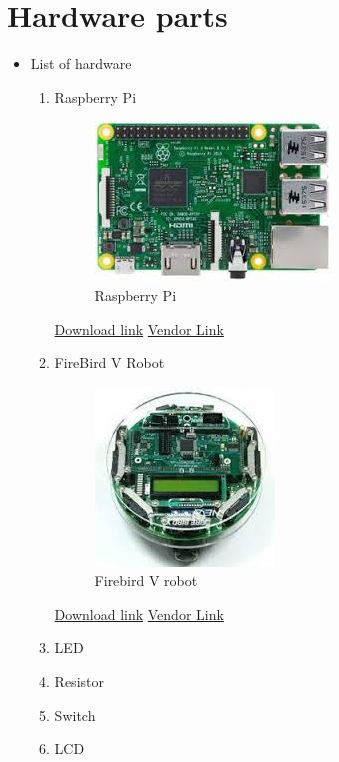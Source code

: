 \documentclass[a4paper,12pt,oneside]{book}
\begin{document}
\section{Hardware parts}
\begin{itemize}
  \item List of hardware 
  \begin{enumerate}
      \item Raspberry Pi \\
      \begin{figure}[H]
        \centering
        \includegraphics[scale=0.6]{RPi}
        \caption{Raspberry Pi}
      \end{figure}
      \href{https://cdn-shop.adafruit.com/pdfs/raspberrypi2modelb.pdf} {Download link}
      \href{http://www.amazon.in/Raspberry-Pi-Model-1GB-Complete/dp/B00T2U7R7I} {Vendor Link}
      \item FireBird V Robot \\
      \begin{figure}[H]
        \centering
        \includegraphics[scale=0.6]{Firebird_V_robot}
        \caption{Firebird V robot}
      \end{figure}
      \href{http://www.atmel.com/Images/Atmel-2549-8-bit-AVR-Microcontroller-ATmega640-1280-1281-2560-2561_datasheet.pdf} {Download link}
      \href{http://www.nex-robotics.com/products/fire-bird-v-robots/fire-bird-v-atmega2560-robotic-research-platform.html} {Vendor Link}
      \item LED
      \item Resistor
      \item Switch
      \item LCD   \\

\end{enumerate}
\end{itemize}
\end{document}
